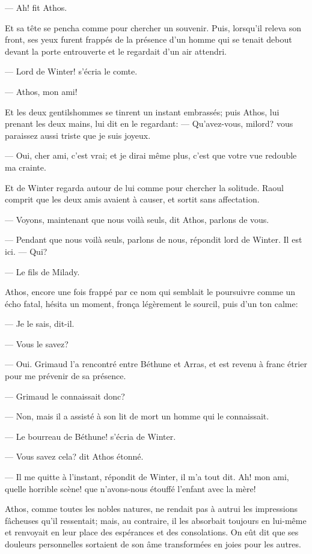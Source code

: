 — Ah! fit Athos.

Et sa tête se pencha comme pour chercher un souvenir. Puis, lorsqu'il releva son front, ses yeux furent frappés de la présence d'un homme qui se tenait debout devant la porte entrouverte et le regardait d'un air attendri.

— Lord de Winter! s'écria le comte.

— Athos, mon ami!

Et les deux gentilshommes se tinrent un instant embrassés; puis Athos, lui prenant les deux mains, lui dit en le regardant:
— Qu'avez-vous, milord? vous paraissez aussi triste que je suis joyeux.

— Oui, cher ami, c'est vrai; et je dirai même plus, c'est que votre vue redouble ma crainte.

Et de Winter regarda autour de lui comme pour chercher la solitude. Raoul comprit que les deux amis avaient à causer, et sortit sans affectation.

— Voyons, maintenant que nous voilà seuls, dit Athos, parlons de vous.

— Pendant que nous voilà seuls, parlons de nous, répondit lord de Winter. Il est ici.
— Qui?

— Le fils de Milady.

Athos, encore une fois frappé par ce nom qui semblait le poursuivre comme un écho fatal, hésita un moment, fronça légèrement le sourcil, puis d'un ton calme:

— Je le sais, dit-il.

— Vous le savez?

— Oui. Grimaud l'a rencontré entre Béthune et Arras, et est revenu à franc étrier pour me prévenir de sa présence.

— Grimaud le connaissait donc?

— Non, mais il a assisté à son lit de mort un homme qui le connaissait.

— Le bourreau de Béthune! s'écria de Winter.

— Vous savez cela? dit Athos étonné.

— Il me quitte à l'instant, répondit de Winter, il m'a tout dit. Ah! mon ami, quelle horrible scène! que n'avons-nous étouffé l'enfant avec la mère!

Athos, comme toutes les nobles natures, ne rendait pas à autrui les impressions fâcheuses qu'il ressentait; mais, au contraire, il les absorbait toujours en lui-même et renvoyait en leur place des espérances et des consolations. On eût dit que ses douleurs personnelles sortaient de son âme transformées en joies pour les autres.


